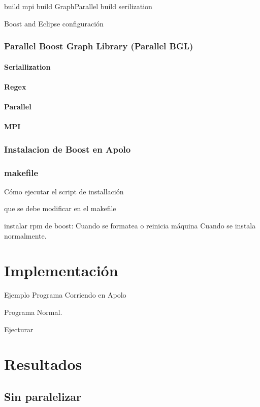 \documentclass[twoside,letterpaper,12pt]{report}
\begin{document}
	build mpi
	build GraphParallel
	build serilization

Boost and Eclipse
	configuración
	
\subsection{Parallel Boost Graph Library (Parallel BGL) }
\subsubsection{Seriallization}
\subsubsection{Regex}
\subsubsection{Parallel}
\subsubsection{MPI}

\subsection{Instalacion de Boost en Apolo}

\subsection{makefile}

Cómo ejecutar el script de installación 

que se debe modificar en el makefile\cite{Wall2000}

instalar rpm de boost:
Cuando se formatea o reinicia máquina
Cuando se instala normalmente.


\chapter{Implementación}

Ejemplo Programa Corriendo en Apolo

Programa Normal. 

Ejecturar


\chapter{Resultados}

\section{Sin paralelizar}
\end{document}
